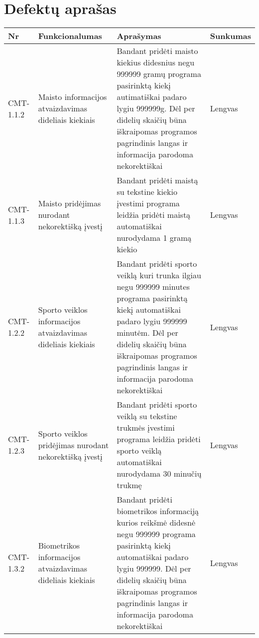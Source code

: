 \documentclass[oneside]{VUMIFPSkursinis}
\begin{document}
\section{Defektų aprašas}
\begin{center}
    \begin{tabular}{ |p{1cm}| p{7cm} | p{7cm} | p{2cm} |}
    \hline
    Nr &  Funkcionalumas & Aprašymas & Sunkumas \\ \hline
    CMT-1.1.2 & Maisto informacijos atvaizdavimas dideliais kiekiais & Bandant pridėti maisto kiekius didesnius negu 999999 gramų programa pasirinktą kiekį autimatiškai padaro lygiu 999999g. Dėl per didelių skaičių būna iškraipomas programos pagrindinis langas ir informacija parodoma nekorektiškai & Lengvas \\ \hline
    CMT-1.1.3 & Maisto pridėjimas nurodant nekorektišką įvestį & Bandant pridėti maistą su tekstine kiekio įvestimi programa leidžia pridėti maistą automatiškai nurodydama 1 gramą kiekio & Lengvas \\ \hline
    CMT-1.2.2 & Sporto veiklos informacijos atvaizdavimas dideliais kiekiais & Bandant pridėti sporto veiklą kuri trunka ilgiau negu 999999 minutes programa pasirinktą kiekį automatiškai padaro lygiu 999999 minutėm. Dėl per didelių skaičių būna iškraipomas programos pagrindinis langas ir informacija parodoma nekorektiškai & Lengvas \\ \hline
    CMT-1.2.3 & Sporto veiklos pridėjimas nurodant nekorektišką įvestį & Bandant pridėti sporto veiklą su tekstine trukmės įvestimi programa leidžia pridėti sporto veiklą automatiškai nurodydama 30 minučių trukmę & Lengvas \\ \hline
    CMT-1.3.2 & Biometrikos informacijos atvaizdavimas dideliais kiekiais & Bandant pridėti biometrikos informaciją kurios reikšmė didesnė negu 999999 programa pasirinktą kiekį automatiškai padaro lygiu 999999. Dėl per didelių skaičių būna iškraipomas programos pagrindinis langas ir informacija parodoma nekorektiškai & Lengvas \\ \hline
   


    \hline
    \end{tabular}
\end{center}


	
\end{document}
